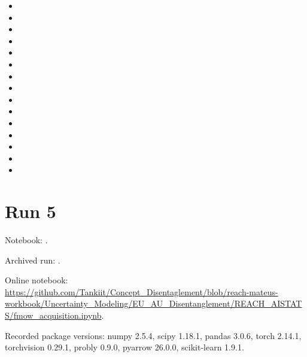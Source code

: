 \begin{itemize}

\item {}

\item {}

\item {}

\item {}

\item {}

\item {}

\item {}

\item {}

\item {}

\item {}

\item {}

\item {}

\item {}

\item {}

\item {}

\end{itemize}

\section{Run 5}

Notebook: .

Archived run: .

Online notebook: \url{https://github.com/Tankiit/Concept_Disentaglement/blob/reach-mateus-workbook/Uncertainty_Modeling/EU_AU_Disentanglement/REACH_AISTATS/fmow_acquisition.ipynb}.

Recorded package versions: numpy 2.5.4, scipy 1.18.1, pandas 3.0.6, torch 2.14.1, torchvision 0.29.1, probly 0.9.0, pyarrow 26.0.0, scikit-learn 1.9.1.

